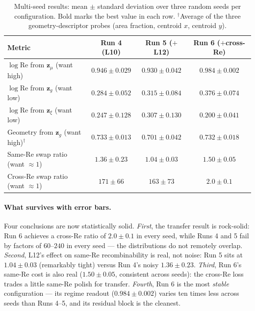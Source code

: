 \documentclass[11pt]{article}
\begin{document}
\begin{table}[htbp]
  \centering
  \caption{Multi-seed results: mean $\pm$ standard deviation over three
  random seeds per configuration. Bold marks the best value in each row.
  $^{\dagger}$Average of the three geometry-descriptor probes (area
  fraction, centroid $x$, centroid $y$).}
  \label{tab:multiseed}
  \begin{tabular}{lccc}
    \toprule
    Metric & Run 4 (L10) & Run 5 ($+$L12) & Run 6 ($+$cross-Re) \\
    \midrule
    $\log \mathrm{Re}$ from $\boldsymbol{z}_{\mu}$ (want high)
      & $0.946 \pm 0.029$ & $0.930 \pm 0.042$ & $\mathbf{0.984 \pm 0.002}$ \\
    $\log \mathrm{Re}$ from $\boldsymbol{z}_{g}$ (want low)
      & $0.284 \pm 0.052$ & $0.315 \pm 0.084$ & $0.376 \pm 0.074$ \\
    $\log \mathrm{Re}$ from $\boldsymbol{z}_{\xi}$ (want low)
      & $0.247 \pm 0.128$ & $0.307 \pm 0.130$ & $\mathbf{0.200 \pm 0.041}$ \\
    Geometry from $\boldsymbol{z}_{g}$ (want high)$^{\dagger}$
      & $\mathbf{0.733 \pm 0.013}$ & $0.701 \pm 0.042$ & $0.732 \pm 0.018$ \\
    Same-Re swap ratio (want $\approx 1$)
      & $1.36 \pm 0.23$ & $\mathbf{1.04 \pm 0.03}$ & $1.50 \pm 0.05$ \\
    Cross-Re swap ratio (want $\approx 1$)
      & $171 \pm 66$ & $163 \pm 73$ & $\mathbf{2.0 \pm 0.1}$ \\
    \bottomrule
  \end{tabular}
\end{table}

\paragraph{What survives with error bars.} Four conclusions are now
statistically solid. \emph{First}, the transfer result is rock-solid:
Run 6 achieves a cross-Re ratio of $2.0 \pm 0.1$ in every seed, while
Runs 4 and 5 fail by factors of $60$--$240$ in every seed --- the
distributions do not remotely overlap. \emph{Second}, L12's effect on
same-Re recombinability is real, not noise: Run 5 sits at
$1.04 \pm 0.03$ (remarkably tight) versus Run 4's noisy
$1.36 \pm 0.23$. \emph{Third}, Run 6's same-Re cost is also real
($1.50 \pm 0.05$, consistent across seeds): the cross-Re loss trades a
little same-Re polish for transfer. \emph{Fourth}, Run 6 is the most
\emph{stable} configuration --- its regime readout ($0.984 \pm 0.002$)
varies ten times less across seeds than Runs 4--5, and its residual
block is the cleanest.
\end{document}
